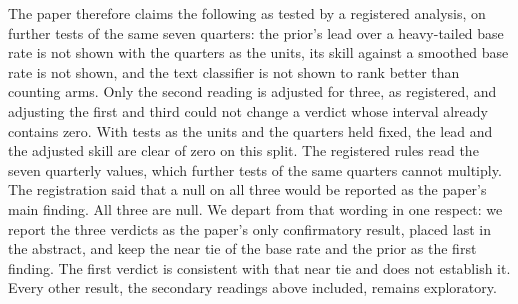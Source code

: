 The paper therefore claims the following as tested by a registered analysis, on further tests of the same seven quarters: the prior's lead over a heavy-tailed base rate is not shown with the quarters as the units, its skill against a smoothed base rate is not shown, and the text classifier is not shown to rank better than counting arms. Only the second reading is adjusted for three, as registered, and adjusting the first and third could not change a verdict whose interval already contains zero. With tests as the units and the quarters held fixed, the lead and the adjusted skill are clear of zero on this split. The registered rules read the seven quarterly values, which further tests of the same quarters cannot multiply. The registration said that a null on all three would be reported as the paper's main finding. All three are null. We depart from that wording in one respect: we report the three verdicts as the paper's only confirmatory result, placed last in the abstract, and keep the near tie of the base rate and the prior as the first finding. The first verdict is consistent with that near tie and does not establish it. Every other result, the secondary readings above included, remains exploratory.
